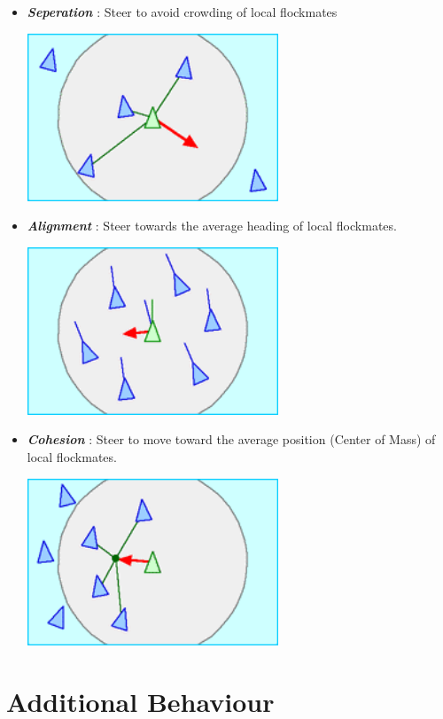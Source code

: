 \documentclass[12pt]{report}
\begin{document}
\begin{itemize}
  \item
  \textbf{\textit{Seperation}} : Steer to avoid crowding of local flockmates
    \begin{center}
      \includegraphics[height=5cm]{Rule_separation.png}
    \end{center}
  \item
  \textbf{\textit{Alignment}} : Steer towards the average heading of local flockmates.
  \begin{center}
    \includegraphics[height=5cm]{Rule_alignment.png}
  \end{center}
  \item
  \textbf{\textit{Cohesion}} : Steer to move toward the average position (Center of Mass) of local flockmates.
    \begin{center}
    \includegraphics[height=5cm]{Rule_cohesion.png}
  \end{center}
\end{itemize}

\section{Additional Behaviour}
\end{document}
